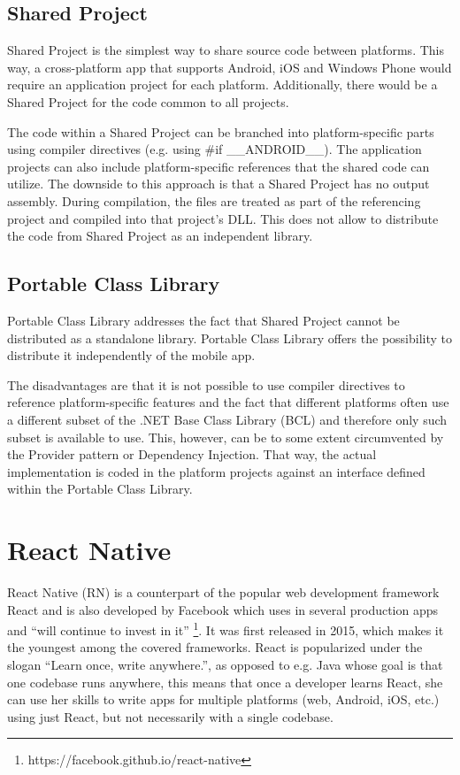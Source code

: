 \subsection{Shared Project}

Shared Project is the simplest way to share source code between platforms. This way, a cross-platform app that supports Android, iOS and Windows Phone would require an application project for each platform. Additionally, there would be a Shared Project for the code common to all projects.

The code within a Shared Project can be branched into platform-specific parts using compiler directives (e.g. using \#if \_\_ANDROID\_\_). The application projects can also include platform-specific references that the shared code can utilize.
The downside to this approach is that a Shared Project has no output assembly. During compilation, the files are treated as part of the referencing project and compiled into that project's DLL. This does not allow to distribute the code from Shared Project as an independent library.

\subsection{Portable Class Library}

Portable Class Library addresses the fact that Shared Project cannot be distributed as a standalone library. Portable Class Library offers the possibility to distribute it independently of the mobile app.

The disadvantages are that it is not possible to use compiler directives to reference platform-specific features and the fact that different platforms often use a different subset of the .NET Base Class Library (BCL) and therefore only such subset is available to use. This, however, can be to some extent circumvented by the Provider pattern or Dependency Injection. That way, the actual implementation is coded in the platform projects against an interface defined within the Portable Class Library.


\section{React Native}

React Native (RN) is a counterpart of the popular web development framework React and is also developed by Facebook which uses in several production apps and ``will continue to invest in it'' \footnote{https://facebook.github.io/react-native}. It was first released in 2015, which makes it the youngest among the covered frameworks. React is popularized under the slogan ``Learn once, write anywhere.'', as opposed to e.g. Java whose goal is that one codebase runs anywhere, this means that once a developer learns React, she can use her skills to write apps for multiple platforms (web, Android, iOS, etc.) using just React, but not necessarily with a single codebase.

